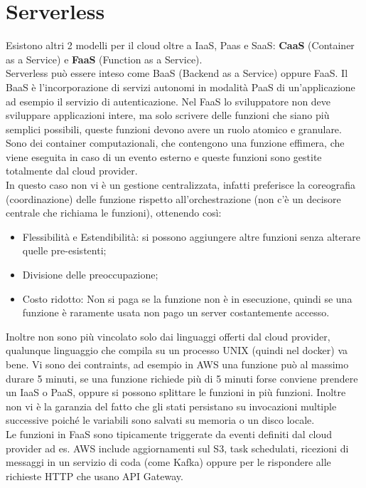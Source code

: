 \documentclass[11pt, twocolumn]{article}
\newenvironment{myitemize}
{ \begin{itemize}[topsep=0ex]
		\setlength{\itemsep}{0pt}
		\setlength{\parskip}{0pt}
		\setlength{\parsep}{0pt}     }
	{ \end{itemize}                  }
\begin{document}
\section{Serverless}
Esistono altri 2 modelli per il cloud oltre a IaaS, Paas e SaaS: \textbf{CaaS} (Container as a Service) e \textbf{FaaS} (Function as a Service).\\
Serverless può essere inteso come BaaS (Backend as a Service) oppure FaaS.
Il BaaS è l'incorporazione di servizi autonomi in modalità PaaS di un'applicazione ad esempio il servizio di autenticazione.
Nel FaaS lo sviluppatore non deve sviluppare applicazioni intere, ma solo scrivere delle funzioni che siano più semplici possibili, queste funzioni devono avere un ruolo atomico e granulare.
Sono dei container computazionali, che contengono una funzione effimera, che viene eseguita in caso di un evento esterno e queste funzioni sono gestite totalmente dal cloud provider.\\
In questo caso non vi è un gestione centralizzata, infatti preferisce la coreografia (coordinazione) delle funzione rispetto all'orchestrazione (non c'è un decisore centrale che richiama le funzioni), ottenendo così:
\begin{myitemize}
	\item Flessibilità e Estendibilità: si possono aggiungere altre funzioni senza alterare quelle pre-esistenti; 
	\item Divisione delle preoccupazione;
	\item Costo ridotto: Non si paga se la funzione non è in esecuzione, quindi se una funzione è raramente usata non pago un server costantemente accesso.
\end{myitemize}
Inoltre non sono più vincolato solo dai linguaggi offerti dal cloud provider, qualunque linguaggio che compila su un processo UNIX (quindi nel docker) va bene.
Vi sono dei contraints, ad esempio in AWS una funzione può al massimo durare 5 minuti, se una funzione richiede più di 5 minuti forse conviene prendere un IaaS o PaaS, oppure si possono splittare le funzioni in più funzioni.
Inoltre non vi è la garanzia del fatto che gli stati persistano su invocazioni multiple successive poiché le variabili sono salvati su memoria o un disco locale.\\
Le funzioni in FaaS sono tipicamente triggerate da eventi definiti dal cloud provider ad es. AWS include aggiornamenti sul S3, task schedulati, ricezioni di messaggi in un servizio di coda (come Kafka) oppure per le rispondere alle richieste HTTP che usano API Gateway.\\
\end{document}
